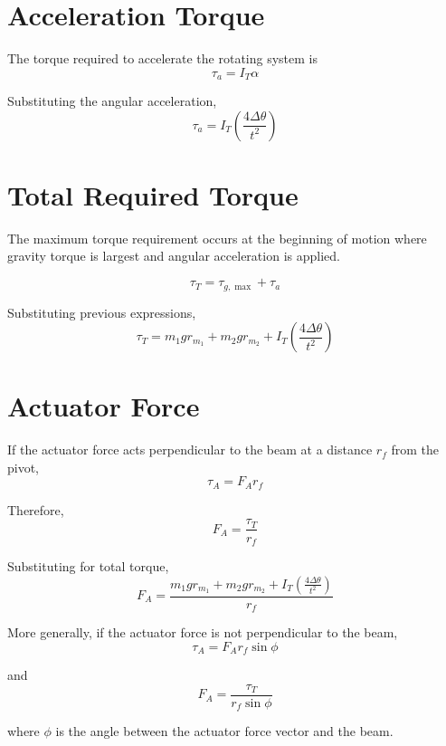 \documentclass[11pt]{article}
\begin{document}
\section{Acceleration Torque}

The torque required to accelerate the rotating system is
\[
    \tau_a = I_T \alpha
\]

Substituting the angular acceleration,
\[
    \boxed{
        \tau_a = I_T
        \left( \frac{4\Delta\theta}{t^2} \right)
    }
\]

\section{Total Required Torque}

The maximum torque requirement occurs at the beginning of
motion where gravity torque is largest and angular
acceleration is applied.

\[
    \tau_T = \tau_{g,\max} + \tau_a
\]

Substituting previous expressions,
\[
    \boxed{
        \tau_T =
        m_1 g r_{m_1}
        + m_2 g r_{m_2}
        + I_T \left( \frac{4\Delta\theta}{t^2} \right)
    }
\]

\section{Actuator Force}

If the actuator force acts perpendicular to the beam at a
distance $r_f$ from the pivot,
\[
    \tau_A = F_A r_f
\]

Therefore,
\[
    \boxed{
        F_A = \frac{\tau_T}{r_f}
    }
\]

Substituting for total torque,
\[
    \boxed{
        F_A =
        \frac{
            m_1 g r_{m_1}
            + m_2 g r_{m_2}
            + I_T \left( \frac{4\Delta\theta}{t^2} \right)
        }{r_f}
    }
\]

More generally, if the actuator force is not perpendicular
to the beam,
\[
    \tau_A = F_A r_f \sin\phi
\]

and
\[
    \boxed{
        F_A = \frac{\tau_T}{r_f\sin\phi}
    }
\]

where $\phi$ is the angle between the actuator force vector
and the beam.
\end{document}
